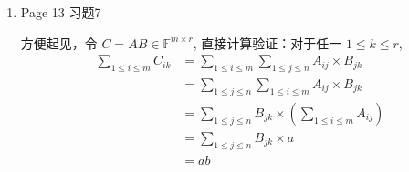 \documentclass{article}
\begin{document}
\begin{enumerate}
\begin{spacing}{1.5}
    \end{spacing}

    \begin{itemize}
        \item [-] 若 $A-k^2\alpha\alpha^\top$ 是正定矩阵，那么 $\left[\begin{array}{cc}A&k\alpha\\k\alpha^\top&1\\\end{array}\right]$ 正定。因为：
        \begin{itemize}
            \item [--] 一方面 $f(x^\prime)\geq 0$ 恒成立;
            \item [--] 另一方面, $f(x^\prime)=0$ 可以推出 $x=0, y=0, x^\prime=0$.
        \end{itemize}
        \item [-] 若 $A-k^2\alpha\alpha^\top$ 是半正定矩阵，那么 $\left[\begin{array}{cc}A&k\alpha\\k\alpha^\top&1\\\end{array}\right]$ 半正定。因为：
        \begin{itemize}
            \item [--] 一方面 $f(x^\prime)\geq 0$ 恒成立;
            \item [--] 另一方面, 由于存在$x\ne 0$ 使得 $x^\top (A-k^2\alpha\alpha^\top)x =0$, 取 $y=-k(x^\top\alpha)$ 即得到非零的 $x^\prime$ 使得 $f(x^\prime)=0$.
        \end{itemize}
        \item [-] 若 $A-k^2\alpha\alpha^\top$ 是不定矩阵，那么 $\left[\begin{array}{cc}A&k\alpha\\k\alpha^\top&1\\\end{array}\right]$ 也是不定的。因为：
        此时 $A-k^2\alpha\alpha^\top$ 存在小于 $0$ 的特征值，取 $x$ 为其对应的特征向量，取 $y=-k(x^\top\alpha)$ 即构造得到 $x^\prime$, $f(x^\prime) < 0$.
    \end{itemize}


    \item Page 13 习题7
    
    方便起见，令 $C=AB\in\mathbb{F}^{m\times r}$, 直接计算验证：对于任一 $1\leq k\leq r$,
    \begin{equation*}
        \begin{array}{ll}
            \sum_{1\leq i\leq m} C_{ik} & = \sum_{1\leq i\leq m} \sum_{1\leq j\leq n} A_{ij}\times B_{jk} \\
            & = \sum_{1\leq j\leq n} \sum_{1\leq i\leq m} A_{ij}\times B_{jk} \\
            & = \sum_{1\leq j\leq n} B_{jk}\times\left(\sum_{1\leq i\leq m} A_{ij}\right) \\
            & = \sum_{1\leq j\leq n} B_{jk} \times a \\ 
            & = ab
        \end{array}
    \end{equation*}

\end{enumerate}
\end{document}
